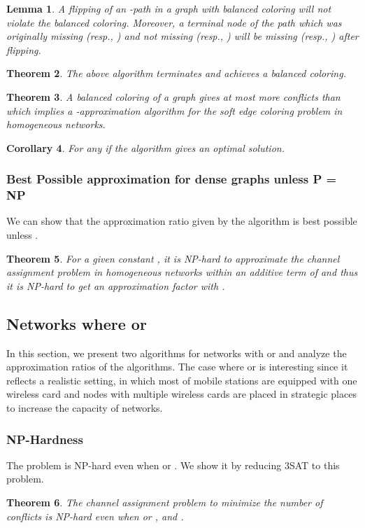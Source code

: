 \documentclass[titlepage, 11pt]{article}
\newtheorem{theorem}{Theorem}
\newtheorem{lemma}[theorem]{Lemma}
\newtheorem{corollary}[theorem]{Corollary}
\begin{document}
\begin{lemma}\label{flipping}
A flipping of an -path in a graph with balanced coloring will not violate the balanced coloring.
Moreover, a terminal node of the path which was originally missing  (resp., ) and not missing  (resp., )
will be missing  (resp., ) after flipping.
\end{lemma}

\begin{theorem}\label{mainthm}
The above algorithm terminates and achieves a balanced coloring.
\end{theorem}

\begin{theorem}\label{approxfactor}
A balanced coloring of a graph gives at most  more conflicts than  which implies a -approximation algorithm for the soft edge coloring problem in homogeneous networks.
\end{theorem}

\begin{corollary}
For any  if   the algorithm gives an optimal solution.
\end{corollary}


\subsubsection{Best Possible approximation for dense graphs unless P = NP}
\label{sec:best}
 We can show that the approximation ratio given by the algorithm 
is best possible unless . 
\begin{theorem}
For a given constant , it is NP-hard to approximate the channel assignment problem  in homogeneous networks 
within an additive term of  and thus it is NP-hard to get an approximation factor with  .
\label{theorem:inapprox}
\end{theorem}

\subsection{Networks where  or }
\label{sec:het}
In this section, 
we present two algorithms for networks with  or 
 and analyze the approximation ratios of the algorithms.
The case where  or  is interesting since 
 it reflects a realistic setting, in which 
most of mobile stations are equipped with one wireless card and 
nodes with multiple wireless cards are placed in strategic places
to increase the capacity of networks.

\subsubsection{NP-Hardness}
\label{sec:hetnp}
The problem is NP-hard even when  or . We show it by reducing 3SAT to this problem. 
\begin{theorem}
The channel assignment problem to minimize the number of conflicts 
is NP-hard even when  or , and .
\label{theorem:nphard}
\end{theorem}
\end{document}
